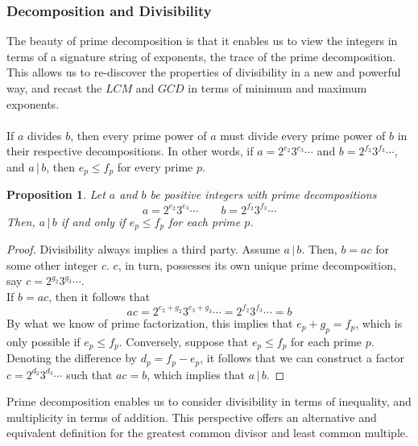 \documentclass{article}
\newtheorem{prop}{Proposition}
\newcommand{\divv}{\,|\,}
\begin{document}
\subsubsection*{Decomposition and Divisibility} 
The beauty of prime decomposition is that it enables us to view the integers in terms of a signature string of exponents, the trace of the prime decomposition. This allows us to re-discover the properties of divisibility in a new and powerful way, and recast the $LCM$ and $GCD$ in terms of minimum and maximum exponents. \\\\
If $a$ divides $b$, then every prime power of $a$ must divide every prime power of $b$ in their respective decompositions. In other words, if $a = 2^{e_2}3^{e_3}\cdots$ and $b = 2^{f_2}3^{f_3}\cdots$, and $a\divv b$, then $e_p\leq f_p$ for every prime $p$. 
\begin{mdframed} 
\begin{prop} 
Let $a$ and $b$ be positive integers with prime decompositions 
\[a = 2^{e_2}3^{e_3}\cdots \qquad b = 2^{f_2}3^{f_3}\cdots \]
Then, $a\divv b$ if and only if $e_p \leq f_p$ for each prime $p$. 
\end{prop} 
\begin{proof} 
Divisibility always implies a third party. Assume $a\divv b$. Then, $b = ac$ for some other integer $c$. $c$, in turn, possesses its own unique prime decomposition, say $c = 2^{g_2}3^{g_3}\cdots$. \\ If $b = ac$, then it follows that \[ac = 2^{e_2 + g_2}3^{e_3 + g_3} \cdots = 2^{f_2}3^{f_3}\cdots = b\]
By what we know of prime factorization, this implies that $e_p + g_p = f_p$, which is only possible if $e_p\leq f_p$. Conversely, suppose that $e_p \leq f_p$ for each prime $p$. Denoting the difference by $d_p = f_p - e_p$, it follows that we can construct a factor $c = 2^{d_2}3^{d_3}\cdots$ such that $ac = b$, which implies that $a\divv b$. 
\end{proof} 
\end{mdframed}
Prime decomposition enables us to consider divisibility in terms of inequality, and multiplicity in terms of addition. This perspective offers an alternative and equivalent definition for the greatest common divisor and least common multiple. 
\end{document}
